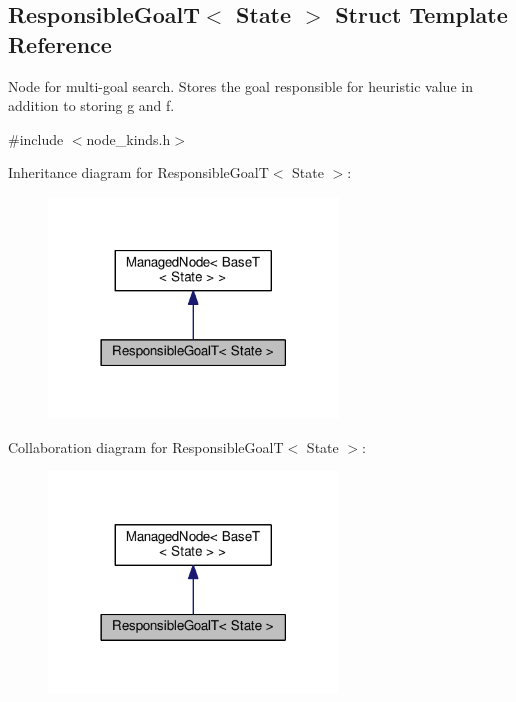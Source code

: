\hypertarget{structResponsibleGoalT}{}\subsection{Responsible\+GoalT$<$ State $>$ Struct Template Reference}
\label{structResponsibleGoalT}


Node for multi-\/goal search. Stores the goal responsible for heuristic value in addition to storing {\ttfamily g} and {\ttfamily f}.  




{\ttfamily \#include $<$node\+\_\+kinds.\+h$>$}



Inheritance diagram for Responsible\+GoalT$<$ State $>$\+:\nopagebreak
\begin{figure}[H]
\begin{center}
\leavevmode
\includegraphics[width=218pt]{structResponsibleGoalT__inherit__graph}
\end{center}
\end{figure}


Collaboration diagram for Responsible\+GoalT$<$ State $>$\+:\nopagebreak
\begin{figure}[H]
\begin{center}
\leavevmode
\includegraphics[width=218pt]{structResponsibleGoalT__coll__graph}
\end{center}
\end{figure}
